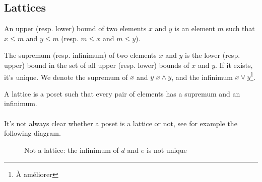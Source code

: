   \subsection{Lattices}

  \begin{definition}
    An upper (resp. lower) bound of two elements $x$ and $y$ is an element $m$ such that $x \le m$ and $y \le m$ (resp. $m \le x$ and $m \le y$).
  \end{definition}

  \begin{definition}
    The supremum (resp. infinimum) of two elements $x$ and $y$ is the lower (resp. upper) bound in the set of all upper (resp. lower) bounds of $x$ and $y$. If it exists, it's unique. We denote the supremum of $x$ and $y$ $x \wedge y$, and the infinimum $ x \vee y$\footnote{À améliorer}.
  \end{definition}

  \begin{definition}[Lattice]
    A lattice is a poset such that every pair of elements has a supremum and an infinimum.
  \end{definition}

  \paragraph{}
  It's not always clear whether a poset is a lattice or not, see for example the following diagram.

  \begin{figure}[H]
    \begin{center}
      \caption{Not a lattice: the infinimum of $d$ and $e$ is not unique}
    \end{center}
  \end{figure}
